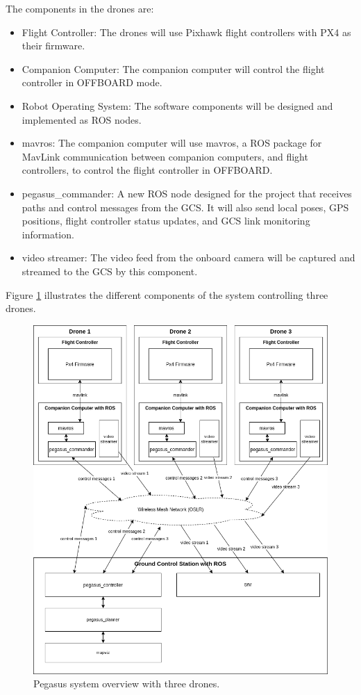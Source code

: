 The components in the drones are:
\begin{itemize}
  \item Flight Controller: The drones will use Pixhawk flight controllers with PX4 as their firmware.
  \item Companion Computer: The companion computer will control the flight controller in OFFBOARD mode.
  \item Robot Operating System: The software components will be designed and implemented as ROS nodes.
  \item mavros: The companion computer will use mavros, a ROS package for MavLink communication between companion computers, and flight controllers, to control the flight controller in OFFBOARD.
  \item pegasus\_commander: A new ROS node designed for the project that receives paths and control messages from the GCS. It will also send local poses, GPS positions, flight controller status updates, and GCS link monitoring information.
  \item video streamer: The video feed from the onboard camera will be captured and streamed to the GCS by this component.
\end{itemize}

Figure \ref{fig:system-overview} illustrates the different components of the system controlling three drones.

\begin{figure} \label{fig:system-overview}
  \centering
  \includegraphics[width=5in]{figures/methodology/system-overview}
  \caption[Pegasus System Overview]{\small Pegasus system overview with three drones.}
\end{figure}


